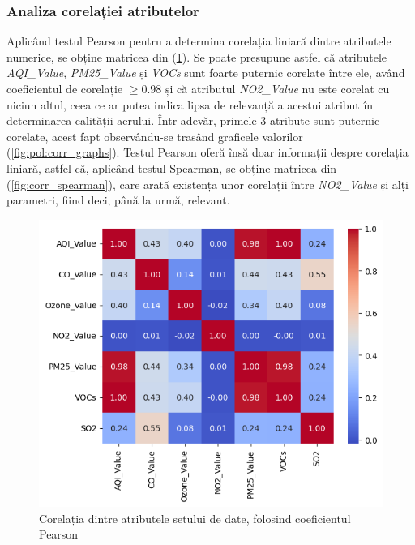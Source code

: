 \documentclass{article}
\begin{document}
\subsubsection{Analiza corelației atributelor}\label{sec:pol:corr}
Aplicând testul Pearson pentru a determina corelația liniară dintre atributele 
numerice, se obține matricea din (\ref{fig:pol:corr}). Se poate presupune
astfel că atributele \textit{AQI\_Value}, \textit{PM25\_Value} și \textit{VOCs}
sunt foarte puternic corelate între ele, având coeficientul de corelație 
$\geq 0.98$ și că atributul \textit{NO2\_Value} nu este corelat cu niciun altul, 
ceea ce ar putea indica lipsa de relevanță a acestui atribut în determinarea 
calității aerului. Într-adevăr, primele 3 atribute sunt puternic corelate, acest 
fapt observându-se trasând graficele valorilor (\ref{fig:pol:corr_graphs}). 
Testul Pearson oferă însă doar informații despre corelația liniară, astfel că, 
aplicând testul Spearman, se obține matricea din (\ref{fig:corr_spearman}), care
arată existența unor corelații între \textit{NO2\_Value} și alți parametri, 
fiind deci, până la urmă, relevant.

\begin{figure}[htb]
    \centering
    \includegraphics[scale=0.6]{air_pollution/analysis/correlation/matrix.png}
    \caption{Corelația dintre atributele setului de date, folosind coeficientul 
    Pearson}
    \label{fig:pol:corr}
\end{figure}
\end{document}
